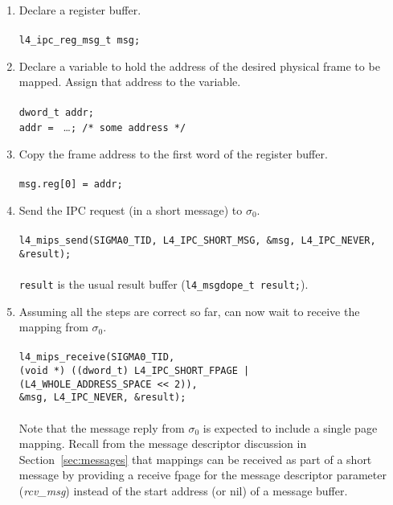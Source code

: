 \begin{enumerate}

\item Declare a register buffer. \\ \\
  \hspace*{10pt} {\footnotesize\verb+l4_ipc_reg_msg_t msg;+}

\item Declare a variable to hold the address of the desired physical
  frame to be mapped. Assign that address to the variable. \\ \\
  \hspace*{10pt} {\footnotesize\verb+dword_t addr;+} \\
  \hspace*{10pt} {\footnotesize\verb+addr = +} \ldots {\footnotesize\verb+; /* some address */+}
  
\item Copy the frame address to the first word of the register buffer.
  \\ \\  \hspace*{10pt} {\footnotesize\verb+msg.reg[0] = addr;+} \\
  
\item Send the IPC request (in a short message) to $\sigma_0$. \\ \\
  \hspace*{10pt} {\footnotesize\verb+l4_mips_send(SIGMA0_TID, L4_IPC_SHORT_MSG, &msg, L4_IPC_NEVER, &result);+} \\ \\
  {\footnotesize\verb+result+} is the usual result buffer ({\footnotesize\verb+l4_msgdope_t result;+}).
  
\item Assuming all the steps are correct so far, can now wait to
  receive the mapping from $\sigma_0$. \\ \\
  \hspace*{10pt} {\footnotesize\verb+l4_mips_receive(SIGMA0_TID,+}\\
  \hspace*{90pt} {\footnotesize\verb+(void *) ((dword_t) L4_IPC_SHORT_FPAGE |+}\\
  \hspace*{95pt} {\footnotesize\verb+(L4_WHOLE_ADDRESS_SPACE << 2)),+}\\
  \hspace*{90pt} {\footnotesize\verb+&msg, L4_IPC_NEVER, &result);+} \\ \\
  Note that the message reply from $\sigma_0$ is expected to include
  a single page mapping. Recall from the message descriptor discussion
  in Section~\ref{sec:messages} that mappings can be received as part of
  a short message by providing a receive fpage for the message
  descriptor parameter (\emph{rcv\_msg}) instead of the start address
  (or nil) of a message buffer.
  

\end{enumerate}
